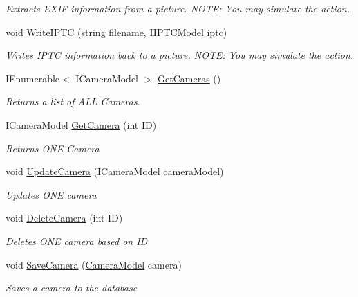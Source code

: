 \begin{DoxyCompactItemize}
\begin{DoxyCompactList}\small\item\em Extracts E\+X\+IF information from a picture. N\+O\+TE\+: You may simulate the action. \end{DoxyCompactList}\item 
void \mbox{\hyperlink{class_pic_d_b_1_1_layers_1_1_business_layer_a71b7710fb19fd81dfda577cf001370ba}{Write\+I\+P\+TC}} (string filename, I\+I\+P\+T\+C\+Model iptc)
\begin{DoxyCompactList}\small\item\em Writes I\+P\+TC information back to a picture. N\+O\+TE\+: You may simulate the action. \end{DoxyCompactList}\item 
I\+Enumerable$<$ I\+Camera\+Model $>$ \mbox{\hyperlink{class_pic_d_b_1_1_layers_1_1_business_layer_abb3939c8c4f0c9dcba3622304f6deda9}{Get\+Cameras}} ()
\begin{DoxyCompactList}\small\item\em Returns a list of A\+LL Cameras. \end{DoxyCompactList}\item 
I\+Camera\+Model \mbox{\hyperlink{class_pic_d_b_1_1_layers_1_1_business_layer_a473f90240ca26a3aae42a4884f909a6b}{Get\+Camera}} (int ID)
\begin{DoxyCompactList}\small\item\em Returns O\+NE Camera \end{DoxyCompactList}\item 
void \mbox{\hyperlink{class_pic_d_b_1_1_layers_1_1_business_layer_a6d69eb6022d1127b86902ed4f478f2f5}{Update\+Camera}} (I\+Camera\+Model camera\+Model)
\begin{DoxyCompactList}\small\item\em Updates O\+NE camera \end{DoxyCompactList}\item 
void \mbox{\hyperlink{class_pic_d_b_1_1_layers_1_1_business_layer_a236b908add236e30587b6f8de83d9a04}{Delete\+Camera}} (int ID)
\begin{DoxyCompactList}\small\item\em Deletes O\+NE camera based on ID \end{DoxyCompactList}\item 
void \mbox{\hyperlink{class_pic_d_b_1_1_layers_1_1_business_layer_a0827e099cb6e0a91995b99e7809bcbf8}{Save\+Camera}} (\mbox{\hyperlink{class_pic_d_b_1_1_models_1_1_camera_model}{Camera\+Model}} camera)
\begin{DoxyCompactList}\small\item\em Saves a camera to the database \end{DoxyCompactList}\item 

\end{DoxyCompactItemize}
